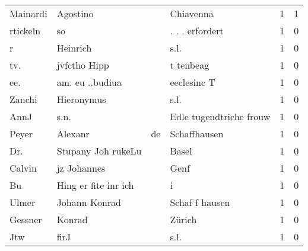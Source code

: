 \begin{tabular}{llllrr}
                 Mainardi &                           Agostino &             &                                   Chiavenna &          1 &         1 \\
                 rtickeln &                                 so &             &                             . . . erfordert &          1 &         0 \\
                        r &                           Heinrich &             &                                        s.l. &          1 &         0 \\
                      tv. &                       jvfctho Hipp &             &                                   t tenbeag &          1 &         0 \\
                      ee. &                    am. eu ..budiua &             &                                 eeclesinc T &          1 &         0 \\
                   Zanchi &                         Hieronymus &             &                                        s.l. &          1 &         0 \\
                     AnnJ &                               s.n. &             &                     Edle tugendtriche frouw &          1 &         0 \\
                    Peyer &                            Alexanr &          de &                                Schaffhausen &          1 &         0 \\
                      Dr. &                 Stupany Joh rukeLu &             &                                       Basel &          1 &         0 \\
                   Calvin &                        jz Johannes &             &                                        Genf &          1 &         0 \\
                       Bu &               Hing er fite inr ich &             &                                           i &          1 &         0 \\
                    Ulmer &                      Johann Konrad &             &                              Schaf f hausen &          1 &         0 \\
                  Gessner &                             Konrad &             &                                      Zürich &          1 &         0 \\
                      Jtw &                               firJ &             &                                        s.l. &          1 &         0 \\

\end{tabular}
